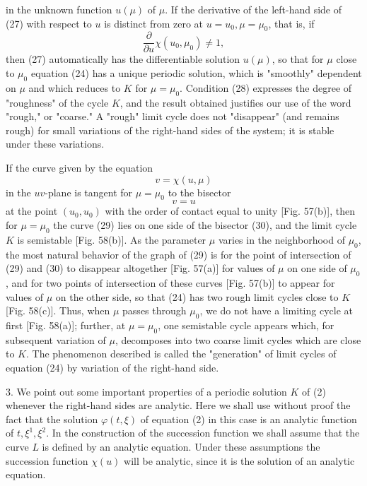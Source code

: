 \documentclass[10pt,a5paper]{book}
\theoremstyle{plain}
\theoremstyle{definition}
\theoremstyle{remark}
\begin{document}
in the unknown function $u(\mu)$ of $\mu$. If the derivative of the left-hand side of (27) with respect to $u$ is distinct from zero at $u=u_{0}, \mu=\mu_{0}$, that is, if
\begin{equation*}
\frac{\partial}{\partial u} \chi\left(u_{0}, \mu_{0}\right) \neq 1, \tag{28}
\end{equation*}
then (27) automatically has the differentiable solution $u(\mu)$, so that for $\mu$ close to $\mu_{0}$ equation (24) has a unique periodic solution, which is "smoothly" dependent on $\mu$ and which reduces to $K$ for $\mu=\mu_{0}$. Condition (28) expresses the degree of "roughness" of the cycle $K$, and the result obtained justifies our use of the word "rough," or "coarse." A "rough" limit cycle does not "disappear" (and remains rough) for small variations of the right-hand sides of the system; it is stable under these variations.

If the curve given by the equation
\begin{equation*}
v=\chi(u, \mu) \tag{29}
\end{equation*}
in the $u v$-plane is tangent for $\mu=\mu_{0}$ to the bisector
\begin{equation*}
v=u \tag{30}
\end{equation*}
at the point $\left(u_{0}, u_{0}\right)$ with the order of contact equal to unity [Fig. 57(b)], then for $\mu=\mu_{0}$ the curve (29) lies on one side of the bisector (30), and the limit cycle $K$ is semistable [Fig. 58(b)]. As the parameter $\mu$ varies in the
neighborhood of $\mu_{0}$, the most natural behavior of the graph of (29) is for the point of intersection of (29) and (30) to disappear altogether [Fig. 57(a)] for values of $\mu$ on one side of $\mu_{0}$, and for two points of intersection of these curves [Fig. 57(b)] to appear for values of $\mu$ on the other side, so that (24) has two rough limit cycles close to $K$ [Fig. 58(c)]. Thus, when $\mu$ passes through $\mu_{0}$, we do not have a limiting cycle at first [Fig. 58(a)]; further, at $\mu=\mu_{0}$, one semistable cycle appears which, for subsequent variation of $\mu$, decomposes into two coarse limit cycles which are close to $K$. The phenomenon described is called the "generation" of limit cycles of equation (24) by variation of the right-hand side.

3. We point out some important properties of a periodic solution $K$ of (2) whenever the right-hand sides are analytic. Here we shall use without proof the fact that the solution $\varphi(t, \xi)$ of equation (2) in this case is an analytic function of $t, \xi^{1}, \xi^{2}$. In the construction of the succession function we shall assume that the curve $L$ is defined by an analytic equation. Under these assumptions the succession function $\chi(u)$ will be analytic, since it is the solution of an analytic equation.
\end{document}
